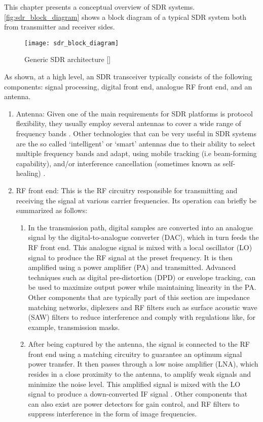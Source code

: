 This chapter presents a conceptual overview of SDR systems. \autoref{fig:sdr_block_diagram} shows a block diagram of a typical SDR system both from transmitter and receiver sides.
\begin{figure}[ht]
  \centering
  \texttt{[image: sdr\_block\_diagram]}
  \caption{Generic SDR architecture [\citeauthor{DBLP:journals/corr/abs-1804-06564}]}
  \label{fig:sdr_block_diagram}
\end{figure}

As shown, at a high level, an SDR transceiver typically consists of the following components: signal processing, digital front end, analogue RF front end, and an antenna.
\begin{enumerate}
  \item Antenna: Given one of the main requirements for SDR platforms is protocol flexibility, they usually employ several antennas to cover a wide range of frequency bands \cite{communications_receivers}. Other technologies that can be very useful in SDR systems are the so called `intelligent' or `smart' antennas due to their ability to select multiple frequency bands and adapt, using mobile tracking (i.e beam-forming capability), and/or interference cancellation (sometimes known as self-healing) \cite{rf_dig_sig_processing} \cite{review_tech_sdr}.

  \item RF front end: This is the RF circuitry responsible for transmitting and receiving the signal at various carrier frequencies. Its operation can briefly be summarized as follows:
  \begin{enumerate}
    \item In the transmission path, digital samples are converted into an analogue signal by the digital-to-analogue converter (DAC), which in turn feeds the RF front end. This analogue signal is mixed with a local oscillator (LO) signal to produce the RF signal at the preset frequency. It is then amplified using a power amplifier (PA) and transmitted. Advanced techniques such as digital pre-distortion (DPD) or envelope tracking, can be used to maximize output power while maintaining linearity in the PA. Other components that are typically part of this section are impedance matching networks, diplexers and RF filters such as surface acoustic wave (SAW) filters to reduce interference and comply with regulations like, for example, transmission masks.
    \item After being captured by the antenna, the signal is connected to the RF front end using a matching circuitry to guarantee an optimum signal power transfer. It then passes through a low noise amplifier (LNA), which resides in a close proximity to the antenna, to amplify weak signals and minimize the noise level. This amplified signal is mixed with the LO signal to produce a down-converted IF signal \cite{tech_radio_handbook}. Other components that can also exist are power detectors for gain control, and RF filters to suppress interference in the form of image frequencies.
  \end{enumerate}


\end{enumerate}
